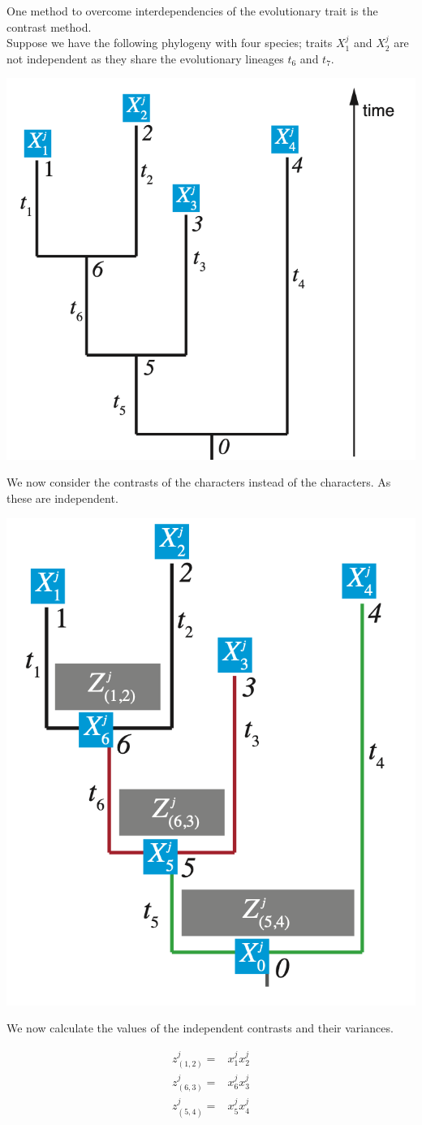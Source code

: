 \documentclass{article}
\begin{document}
\begin{multicols*}{3}
One method to overcome interdependencies of the evolutionary trait is the contrast method.\\ 
Suppose we have the following phylogeny with four species; traits $X_1^j$ and $X_2^j$ are not independent as they share the evolutionary lineages $t_6$ and $t_7$.  
\begin{center}
    \includegraphics[width=0.6\linewidth, angle=0.0]{depchar.png}
\end{center}

We now consider the contrasts of the characters instead of the characters. As these are independent. 

\begin{center}
    \includegraphics[width=0.6\linewidth, angle=0.0]{indepchar.png}
\end{center}

We now calculate the values of the independent contrasts and their variances. 

\begin{align*}
    z^j_{(1,2)} =& x_1^jx_2^j\\
    z^j_{(6,3)} =& x_6^jx_3^j\\
    z^j_{(5,4)} =& x_5^jx_4^j
\end{align*}


\end{multicols*}
\end{document}
